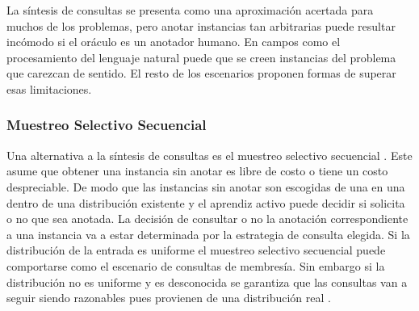 La síntesis de consultas se presenta como una aproximación acertada para muchos de los problemas, pero anotar instancias tan arbitrarias puede resultar incómodo si el oráculo es un anotador humano. En campos como el procesamiento del lenguaje natural puede que se creen instancias del problema que carezcan de sentido. El resto de los escenarios proponen formas de superar esas limitaciones.  

\subsubsection{Muestreo Selectivo Secuencial}


Una alternativa a la síntesis de consultas es el muestreo selectivo secuencial \cite{atlas1989training}. Este asume que obtener una instancia sin anotar es libre de costo o tiene un costo despreciable. De modo que las instancias sin anotar son escogidas de una en una dentro de una distribución existente y el aprendiz activo puede decidir si solicita o no que sea anotada. La decisión de consultar o no la anotación correspondiente a una instancia va a estar determinada por la estrategia de consulta elegida. Si la distribución de la entrada es uniforme el muestreo selectivo secuencial puede comportarse como el escenario de consultas de membresía. Sin embargo si la distribución no es uniforme y es desconocida se garantiza que las consultas van a seguir siendo razonables pues provienen de una distribución real \cite{settles2009survey}.    

